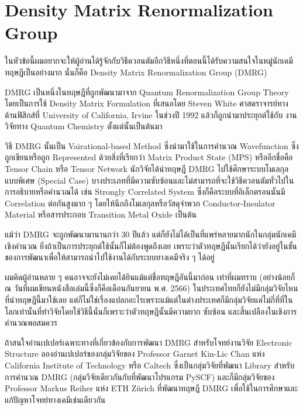 \section{Density Matrix Renormalization Group}

ในหัวข้อนี้ผมอยากจะให้ผู้อ่านได้รู้จักกับวิธีควอนตัมอีกวิธีหนึ่งที่ตอนนี้ได้รับความสนใจในหมู่นักเคมีทฤษฎีเป็นอย่างมาก นั่นก็คือ Density Matrix
Renormalization Group (DMRG)

DMRG เป็นหนึ่งในทฤษฎีที่ถูกพัฒนามาจาก Quantum Renormalization Group Theory โดยเป็นการใช้ Density Matrix Formulation
ที่เสนอโดย Steven White ศาสตราจารย์ทางด้านฟิสิกส์ที่ University of California, Irvine ในช่วงปี 1992 แล้วก็ถูกนำมาประยุกต์ใช้กับ%
งานวิจัยทาง Quantum Chemistry ตั้งแต่นั้นเป็นต้นมา

วิธี DMRG นั้นเป็น Vairational-based Method ซึ่งนำมาใช้ในการคำนวณ Wavefunction ซึ่งถูกเขียนหรือถูก Represented ด้วยสิ่งที่เรียกว่า
Matrix Product State (MPS) หรืออีกชื่อคือ Tensor Chain หรือ Tensor Network นักวิจัยได้นำทฤษฎี DMRG ไปใช้ศึกษาระบบโมเลกุลแบบพิเศษ
(Special Case) บางประเภทที่มีความซับซ้อนและไม่สามารถที่จะใช้วิธีควอนตัมทั่วไปในการอธิบายหรือคำนวณได้ เช่น Strongly Correlated
System ซึ่งก็คือระบบที่อิเล็กตรอนนั้นมี Correlation ต่อกันสูงมาก ๆ โดยให้นึกถึงโมเลกุลหรือวัสดุจำพวก Conductor-Insulator Material
หรือสารประกอบ Transition Metal Oxide เป็นต้น

แม้ว่า DMRG จะถูกพัฒนามานานกว่า 30 ปีแล้ว แต่ก็ยังไม่ได้เป็นที่แพร่หลายมากนักในกลุ่มนักเคมีเชิงคำนวณ ยิ่งถ้าเป็นการประยุกต์ใช้นั้นก็ไม่ต้องพูดถึงเลย
เพราะว่าตัวทฤษฎีนั้นเรียกได้ว่ายังอยู่ในขั้นของการพัฒนาเพื่อให้สามารถนำไปใช้งานได้กับระบบทางเคมีจริง ๆ ได้อยู่

ผมคิดผู้อ่านหลาย ๆ คนอาจจะยังไม่เคยได้ยินแม้แต่ชื่อทฤษฎีอันนี้มาก่อน เท่าที่ผมทราบ (อย่างน้อยก็ ณ วันที่ผมเขียนหนังสือเล่มนี้ซึ่งก็คือเดือนกันยายน
พ.ศ. 2566) ในประเทศไทยก็ยังไม่มีกลุ่มวิจัยไหนที่นำทฤษฎีนี้มาใช้เลย แต่ก็ไม่ใช่เรื่องแปลกอะไรเพราะแม้แต่ในต่างประเทศก็มีกลุ่มวิจัยแค่ไม่กี่ที่ที่ใน%
โลกเท่านั้นที่ทำวิจัยโดยใช้วิธีนี้นั่นก็เพราะว่าตัวทฤษฎีนั้นมีความยาก ซับซ้อน และสิ้นเปลืองในเชิงการคำนวณพอสมควร

ถ้าสนใจอ่านเปเปอร์เฉพาะทางที่เกี่ยวข้องกับการพัฒนา DMRG สำหรับโจทย์งานวิจัย Electronic Structure ลองอ่านเปเปอร์ของกลุ่มวิจัยของ
Professor Garnet Kin-Lic Chan แห่ง California Institute of Technology หรือ Caltech ซึ่งเป็นกลุ่มวิจัยที่พัฒนา Library
สำหรับการคำนวณ DMRG (กลุ่มวิจัยเดียวกันกับที่พัฒนาโปรแกรม PySCF) และก็มีกลุ่มวิจัยของ Professor Markus Reiher แห่ง ETH Zürich
ที่พัฒนาทฤษฎี DMRG เพื่อใช้ในการศึกษาและแก้ปัญหาโจทย์ทางเคมีเช่นเดียวกัน

